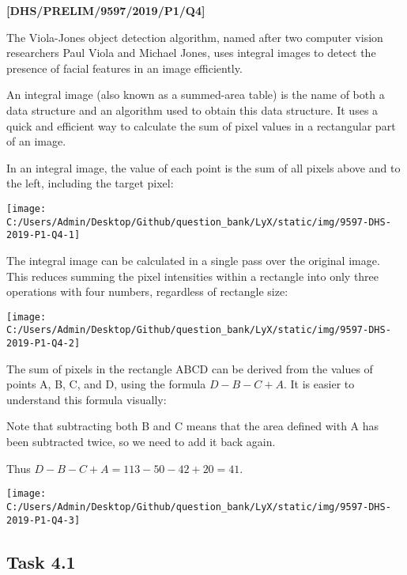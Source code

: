 \item \textbf{{[}DHS/PRELIM/9597/2019/P1/Q4{]} }

The Viola-Jones object detection algorithm, named after two computer
vision researchers Paul Viola and Michael Jones, uses integral images
to detect the presence of facial features in an image efficiently. 

An integral image (also known as a summed-area table) is the name
of both a data structure and an algorithm used to obtain this data
structure. It uses a quick and efficient way to calculate the sum
of pixel values in a rectangular part of an image. 

In an integral image, the value of each point is the sum of all pixels
above and to the left, including the target pixel: 
\begin{center}
\texttt{[image: C:/Users/Admin/Desktop/Github/question\_bank/LyX/static/img/9597-DHS-2019-P1-Q4-1]}
\par\end{center}

The integral image can be calculated in a single pass over the original
image. This reduces summing the pixel intensities within a rectangle
into only three operations with four numbers, regardless of rectangle
size: 
\begin{center}
\texttt{[image: C:/Users/Admin/Desktop/Github/question\_bank/LyX/static/img/9597-DHS-2019-P1-Q4-2]}
\par\end{center}

The sum of pixels in the rectangle ABCD can be derived from the values
of points A, B, C, and D, using the formula $D-B-C+A$. It is easier
to understand this formula visually:

Note that subtracting both B and C means that the area defined with
A has been subtracted twice, so we need to add it back again. 

Thus $D-B-C+A=113-50-42+20=41$. 
\begin{center}
\texttt{[image: C:/Users/Admin/Desktop/Github/question\_bank/LyX/static/img/9597-DHS-2019-P1-Q4-3]}
\par\end{center}

\subsection*{Task 4.1 }

